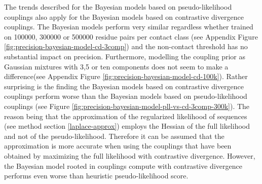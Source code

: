 \documentclass[11pt,a4paper,twoside]{book}
\theoremstyle{definition}
\theoremstyle{definition}
\theoremstyle{remark}
\begin{document}
The trends described for the Bayesian models based on pseudo-likelihood
couplings also apply for the Bayesian models based on contrastive
divergence couplings. The Bayesian models perform very similar
regardless whether trained on 100000, 300000 or 500000 residue pairs per
contact class (see Appendix Figure
\ref{fig:precision-bayesian-model-cd-3comp}) and the non-contact
threshold has no substantial impact on precision. Furthermore, modelling
the coupling prior as Gaussian mixtures with 3,5 or ten components does
not seem to make a difference(see Appendix Figure
\ref{fig:precision-bayesian-model-cd-100k}). Rather surprising is the
finding the Bayesian models based on contrastive divergence couplings
perform worse than the Bayesian models based on pseudo-likelihood
couplings (see Figure
\ref{fig:precision-bayesian-model-pll-vs-cd-3comp-300k}). The reason
being that the approximation of the regularized likelihood of sequences
(see method section \ref{laplace-approx}) employs the Hessian of the
full likelihood and not of the pseudo-likelihood. Therefore it can be
assumed that the approximation is more accurate when using the couplings
that have been obtained by maximizing the full likelihood with
contrastive divergence. However, the Bayesian model rooted in couplings
compute with contrastive divergence performs even worse than heuristic
pseudo-likelihood score.
\end{document}
